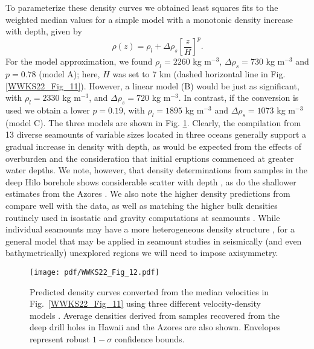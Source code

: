 To parameterize these density curves we obtained least squares fits to the weighted median values for a simple model with a
monotonic density increase with depth, given by
\begin{equation*}
\rho(z) = \rho_l + \Delta \rho_s \left [ \frac{z}{H} \right ]^p.
\end{equation*}
For the \citet{B2005} model approximation, we found $\rho_l = 2260$ kg m$^{-3}$, $\Delta \rho_s = 730$ kg m$^{-3}$ and $p = 0.78$ (model A);
here, $H$ was set to 7 km (dashed horizontal line in Fig. \ref{WWKS22_Fig_11}). However, a linear model (B) would be just as significant, with
$\rho_l = 2330$ kg m$^{-3}$, and $\Delta \rho_s = 720$ kg m$^{-3}$. In contrast, if the \citet{CR1984} conversion is used we
obtain a lower $p = 0.19$, with $\rho_l = 1895$ kg m$^{-3}$ and $\Delta \rho_s = 1073$ kg m$^{-3}$ (model C).
The three models are shown in Fig. \ref{WWKS22_Fig_12}.
Clearly, the compilation from 13 diverse seamounts of variable sizes located in three oceans generally support a gradual
increase in density with depth, as would be expected from the effects of overburden and the consideration that initial
eruptions commenced at greater water depths. We note, however, that density determinations from samples in the deep Hilo
borehole shows considerable scatter with depth \citep{JM2001}, as do the shallower estimates from the Azores \citep{H1979}.
We also note the higher density predictions from \citet{CR1984} compare well with the data, as well as matching the higher
bulk densities routinely used in isostatic and gravity computations at seamounts \citep[e.g.,~][]{WSSW06}.
While individual seamounts may have a more heterogeneous density structure \citep[e.g.,~][]{EMH05,H1991}, for a general model
that may be applied in seamount studies in seismically (and even bathymetrically) unexplored regions we will need to impose axisymmetry.

\begin{figure}
\centering
\texttt{[image: pdf/WWKS22\_Fig\_12.pdf]}
\caption{Predicted density curves converted from the median velocities in Fig.~\ref{WWKS22_Fig_11} using three different
velocity-density models \citep{B2005,LND70,CR1984}. Average densities derived from samples recovered from the deep drill holes
in Hawaii \citep{JM2001} and the Azores \citep{H1979} are also shown. Envelopes represent robust $1-\sigma$ confidence bounds.}
\label{WWKS22_Fig_12}
\end{figure}

